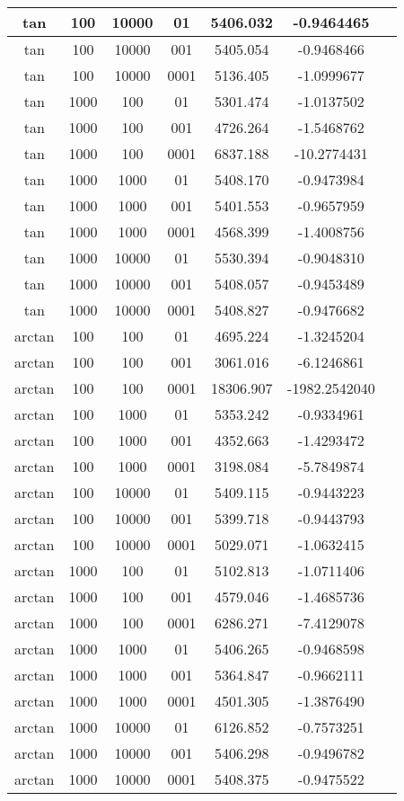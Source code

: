 \begin{tabular}{|c|c|c|c|c|c|c|}
\hline
tan 	& 100  		&	10000 	& 	01 		&	5406.032	&	 -0.9464465	\\ 
\hline
tan 	& 100  		&	10000 	& 	001 	&	5405.054	&	 -0.9468466	\\ 
\hline
tan 	& 100  		&	10000 	& 	0001 	&	5136.405	&	 -1.0999677	\\ 
\hline
tan 	& 1000 		&	 100  	& 	01 		&	5301.474	&	 -1.0137502	\\ 
\hline
tan 	& 1000 		&	 100  	& 	001 	&	4726.264	&	 -1.5468762	\\ 
\hline
tan 	& 1000 		&	 100  	& 	0001 	&	6837.188 	&	-10.2774431	\\ 
\hline
tan 	& 1000 		&	 1000 	 & 	01		&	 5408.170	&	 -0.9473984	\\ 
\hline
tan 	& 1000 		&	 1000 	 & 	001 	&	5401.553 	&	-0.9657959\\ 
\hline
tan 	& 1000 		&	 1000 	 & 	0001	&	 4568.399	&	 -1.4008756\\ 
\hline
tan 	& 1000 		&	 10000	 & 	01		&	 5530.394	&	 -0.9048310\\ 
\hline
tan 	& 1000 		&	 10000	 & 	001		&	 5408.057	&	 -0.9453489\\ 
\hline
tan 	& 1000 		&	 10000	 & 	0001	&	 5408.827	&	 -0.9476682\\ 
\hline
arctan& 100 &100	& 01& 4695.224& -1.3245204	\\ 
\hline
arctan& 100 &100	& 001 &3061.016 & -6.1246861	\\ 
\hline
arctan& 100 &100	& 0001 &18306.907& -1982.2542040	\\ 
\hline
arctan& 100 &1000 	&01 &5353.242& -0.9334961	\\ 
\hline
arctan& 100 &1000	& 001 &4352.663& -1.4293472	\\ 
\hline
arctan& 100 &1000	& 0001 &3198.084& -5.7849874	\\ 
\hline
arctan& 100 &10000	& 01 &5409.115& -0.9443223		\\ 
\hline
arctan& 100 &10000	& 001 &5399.718& -0.9443793	\\ 
\hline
arctan& 100 &10000 	&	0001 &5029.071 &-1.0632415	\\ 
\hline
arctan& 1000& 100 	&01& 5102.813& -1.0711406	\\ 
\hline
arctan& 1000& 100 	&001 &4579.046& -1.4685736	\\ 
\hline
arctan& 1000& 100 	&0001& 6286.271& -7.4129078	\\ 
\hline
arctan& 1000& 1000 	&01 &5406.265& -0.9468598	\\ 
\hline
arctan& 1000& 1000 	&001& 5364.847 &-0.9662111	\\ 
\hline
arctan& 1000& 1000 	&0001& 4501.305& -1.3876490	\\ 
\hline
arctan& 1000& 10000 &01 &6126.852 &-0.7573251	\\ 
\hline
arctan& 1000& 10000 &001 &5406.298 &-0.9496782	\\ 
\hline
arctan& 1000& 10000 &0001 &5408.375& -0.9475522	\\ 
\hline

\end{tabular}
